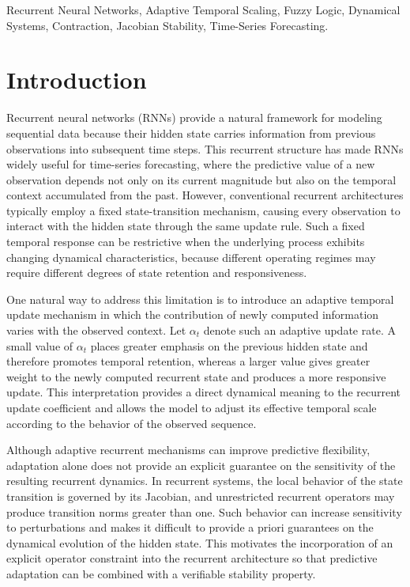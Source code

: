 \documentclass[journal]{IEEEtran}
\begin{document}
	
	\begin{IEEEkeywords}
		Recurrent Neural Networks,
		Adaptive Temporal Scaling,
		Fuzzy Logic,
		Dynamical Systems,
		Contraction,
		Jacobian Stability,
		Time-Series Forecasting.
	\end{IEEEkeywords}
	
	
	
	\section{Introduction}
	\label{sec:introduction}
	
	Recurrent neural networks (RNNs) provide a natural framework for modeling sequential data because their hidden state carries information from previous observations into subsequent time steps. This recurrent structure has made RNNs widely useful for time-series forecasting, where the predictive value of a new observation depends not only on its current magnitude but also on the temporal context accumulated from the past. However, conventional recurrent architectures typically employ a fixed state-transition mechanism, causing every observation to interact with the hidden state through the same update rule. Such a fixed temporal response can be restrictive when the underlying process exhibits changing dynamical characteristics, because different operating regimes may require different degrees of state retention and responsiveness.
	
	One natural way to address this limitation is to introduce an adaptive temporal update mechanism in which the contribution of newly computed information varies with the observed context. Let $\alpha_t$ denote such an adaptive update rate. A small value of $\alpha_t$ places greater emphasis on the previous hidden state and therefore promotes temporal retention, whereas a larger value gives greater weight to the newly computed recurrent state and produces a more responsive update. This interpretation provides a direct dynamical meaning to the recurrent update coefficient and allows the model to adjust its effective temporal scale according to the behavior of the observed sequence.
	
	Although adaptive recurrent mechanisms can improve predictive flexibility, adaptation alone does not provide an explicit guarantee on the sensitivity of the resulting recurrent dynamics. In recurrent systems, the local behavior of the state transition is governed by its Jacobian, and unrestricted recurrent operators may produce transition norms greater than one. Such behavior can increase sensitivity to perturbations and makes it difficult to provide a priori guarantees on the dynamical evolution of the hidden state. This motivates the incorporation of an explicit operator constraint into the recurrent architecture so that predictive adaptation can be combined with a verifiable stability property.
	
\end{document}
